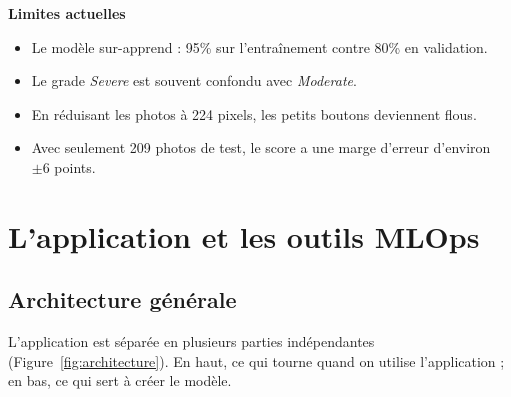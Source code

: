 \documentclass[11pt,a4paper]{report}
\begin{document}
\begin{limite}
\textbf{Limites actuelles}
\begin{itemize}[noitemsep,topsep=2pt]
    \item Le modèle sur-apprend : 95\% sur l'entraînement contre 80\% en validation.
    \item Le grade \textit{Severe} est souvent confondu avec \textit{Moderate}.
    \item En réduisant les photos à 224 pixels, les petits boutons deviennent flous.
    \item Avec seulement 209 photos de test, le score a une marge d'erreur d'environ $\pm6$ points.
\end{itemize}
\end{limite}

\chapter{L'application et les outils MLOps}

\section{Architecture générale}

L'application est séparée en plusieurs parties indépendantes (Figure~\ref{fig:architecture}).
En haut, ce qui tourne quand on utilise l'application ; en bas, ce qui sert à créer le modèle.
\end{document}
